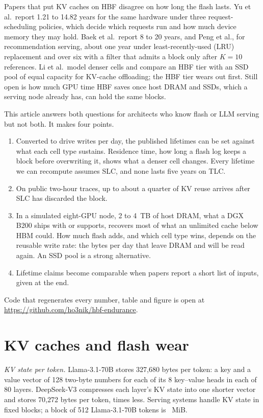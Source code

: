 \documentclass[journal]{IEEEtran}
\newcommand{\repourl}{\url{https://github.com/ho3nik/hbf-endurance}}
\begin{document}
Papers that put KV caches on HBF disagree on how long the flash lasts. Yu et al.\ report 1.21 to 14.82 years for the same hardware under three request-scheduling policies, which decide which requests run and how much device memory they may hold.\cite{yu2026hbf} Baek et al.\ report 8 to 20 years,\cite{baek2026hotcold} and Peng et al., for recommendation serving, about one year under least-recently-used (LRU) replacement and over six with a filter that admits a block only after $K=10$ references.\cite{peng2026gr} Li et al.\ model denser cells and compare an HBF tier with an SSD pool of equal capacity for KV-cache offloading; the HBF tier wears out first.\cite{li2026hbfsucks} Still open is how much GPU time HBF saves once host DRAM and SSDs, which a serving node already has, can hold the same blocks.

This article answers both questions for architects who know flash or LLM serving but not both. It makes four points.
\begin{enumerate}
\item Converted to drive writes per day, the published lifetimes can be set against what each cell type sustains. Residence time, how long a flash log keeps a block before overwriting it, shows what a denser cell changes. Every lifetime we can recompute assumes SLC, and none lasts five years on TLC.
\item On public two-hour traces, up to about a quarter of KV reuse arrives after SLC has discarded the block.
\item In a simulated eight-GPU node, 2 to 4~TB of host DRAM, what a DGX B200 ships with or supports, recovers most of what an unlimited cache below HBM could. How much flash adds, and which cell type wins, depends on the reusable write rate: the bytes per day that leave DRAM and will be read again. An SSD pool is a strong alternative.
\item Lifetime claims become comparable when papers report a short list of inputs, given at the end.
\end{enumerate}
Code that regenerates every number, table and figure is open at \repourl.

\section{KV caches and flash wear}

\emph{KV state per token.} Llama-3.1-70B stores 327,680 bytes per token: a key and a value vector of 128 two-byte numbers for each of its 8 key--value heads in each of 80 layers. DeepSeek-V3 compresses each layer's KV state into one shorter vector and stores 70,272 bytes per token, \KVRatio{} times less. Serving systems handle KV state in fixed blocks; a block of 512 Llama-3.1-70B tokens is \BlockMiB{}~MiB.
\end{document}

